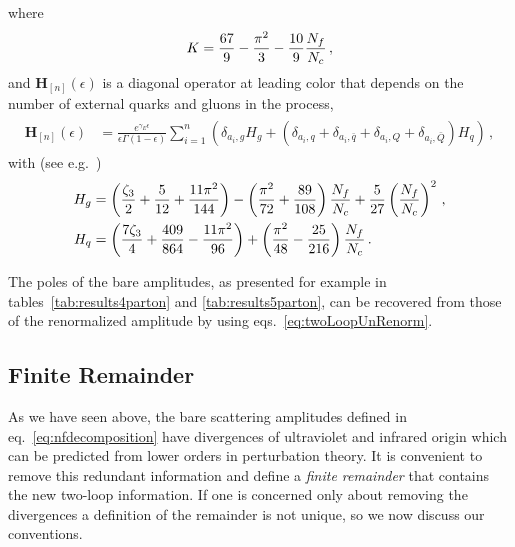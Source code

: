 where 
\begin{equation}
K=\frac{67}{9}-\frac{\pi ^2}{3}-\frac{10}{9}\frac{{N_f}}{{N_c}}\,,
\end{equation}
and $\mathbf{H}_{[n]}(\epsilon)$ is a diagonal operator at 
leading color that depends on the number of external quarks 
and gluons in the process,
\begin{align}
  \begin{split}
    \mathbf{H}_{[n]}(\epsilon)&=
    \frac{e^{\gamma_E\epsilon}}{\epsilon\Gamma(1-\epsilon)}
    \sum_{i=1}^n\left(
    \delta_{a_i,g}H_g+
    (\delta_{a_i,q}+\delta_{a_i,\bar q}
    +\delta_{a_i,Q}+\delta_{a_i,\bar Q})
    H_q
    \right)\,,
  \end{split}
\end{align}
with (see e.g.~\cite{Bern:2003ck})
\begin{align}
  \begin{split}
    H_g&= \left(\frac{\zeta_3}{2}+\frac{5}{12}+
    \frac{11\pi^2}{144}\right)
    -\left(\frac{\pi^2}{72}+\frac{89}{108}\right)\frac{N_f}{{N_c}}
    +\frac{5}{27}\left(\frac{N_f}{{N_c}}\right)^2\,,\\
    H_q&=
    \left(\frac{7\zeta_3}{4}+\frac{409}{864}
    -\frac{11\pi^2}{96}\right)
    +\left(\frac{\pi^2}{48}-\frac{25}{216}\right)\frac{N_f}{{N_c}}\,.
  \end{split}
\end{align}

The poles of the bare amplitudes, as presented for example in
tables~\ref{tab:results4parton} and \ref{tab:results5parton}, can be recovered
from those of the renormalized amplitude by using
eqs.~\eqref{eq:twoLoopUnRenorm}.

\subsection{Finite Remainder}\label{sec:remainders}

As we have seen above,
the bare scattering amplitudes defined in eq.~\eqref{eq:nfdecomposition}
have divergences of ultraviolet and infrared origin which can be predicted from lower orders in perturbation theory.
It is convenient to remove this redundant information and define a \emph{finite remainder} that contains the new two-loop information.
If one is concerned only about removing the divergences a definition of the remainder is not unique, so we now discuss our conventions.


